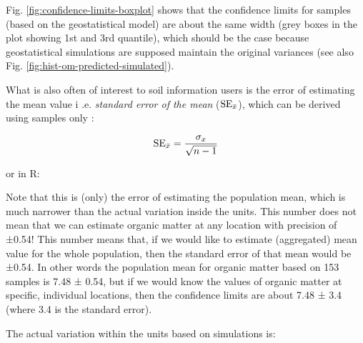\documentclass[graybox,natbib,nospthms,UStrade]{svmono}
\newenvironment{Shaded}{\begin{snugshade}}{\end{snugshade}}
\newcommand{\CommentTok}[1]{\textcolor[rgb]{0.37,0.37,0.37}{\textit{#1}}}
\newcommand{\DataTypeTok}[1]{\textcolor[rgb]{0.27,0.27,0.27}{#1}}
\newcommand{\DecValTok}[1]{\textcolor[rgb]{0.06,0.06,0.06}{#1}}
\newcommand{\FloatTok}[1]{\textcolor[rgb]{0.06,0.06,0.06}{#1}}
\newcommand{\KeywordTok}[1]{\textcolor[rgb]{0.27,0.27,0.27}{\textbf{#1}}}
\newcommand{\NormalTok}[1]{#1}
\newcommand{\OperatorTok}[1]{\textcolor[rgb]{0.43,0.43,0.43}{\textbf{#1}}}
\newcommand{\OtherTok}[1]{\textcolor[rgb]{0.37,0.37,0.37}{#1}}
\newcommand{\StringTok}[1]{\textcolor[rgb]{0.5,0.5,0.5}{#1}}
\begin{document}
Fig. \ref{fig:confidence-limits-boxplot} shows that the confidence
limits for samples (based on the geostatistical model) are about the
same width (grey boxes in the plot showing 1st and 3rd quantile), which
should be the case because geostatistical simulations are supposed
maintain the original variances (see also
Fig. \ref{fig:hist-om-predicted-simulated}).

What is also often of interest to soil information users is the error of
estimating the mean value i .e. \emph{standard error of the mean}
(\({\rm{SE}}_{\bar{x}}\)), which can be derived using samples only
\citep{kutner2005applied}:

\begin{equation}
{\rm{SE}}_{\bar{x}} = \frac{\sigma_x}{\sqrt{n-1}}
\label{eq:mean-pop}
\end{equation}

or in R:

\begin{Shaded}
\end{Shaded}

Note that this is (only) the error of estimating the population mean, which
is much narrower than the actual variation inside the units. This number
does not mean that we can estimate organic matter at any location with
precision of ±0.54! This number means that, if we would like to
estimate (aggregated) mean value for the whole population, then the
standard error of that mean would be ±0.54. In other words the
population mean for organic matter based on 153 samples is
7.48 ± 0.54, but if we would know the values of organic matter at
specific, individual locations, then the confidence limits are about 7.48 ± 3.4
(where 3.4 is the standard error).

The actual variation within the units based on simulations is:
\end{document}
